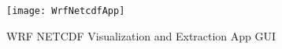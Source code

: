 
\begin{figure}[H]
\centering
\texttt{[image: WrfNetcdfApp]}
\caption{WRF NETCDF Visualization and Extraction App GUI}
\label{figApp6_1} %
\end{figure}